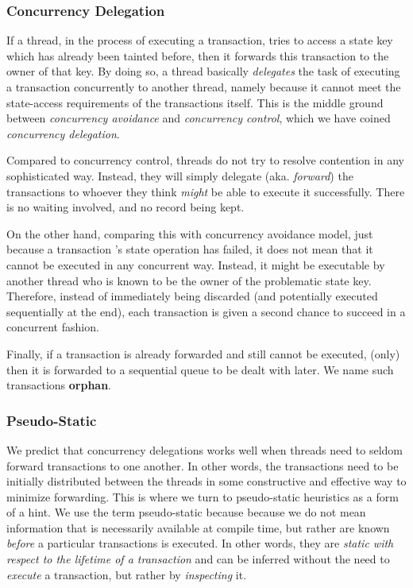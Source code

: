\subsubsection{Concurrency Delegation}

If a thread, in the process of executing a transaction, tries to access a state key which has
already been tainted before, then it forwards this transaction to the owner of that key. By doing
so, a thread basically \textit{delegates} the task of executing a transaction concurrently to
another thread, namely because it cannot meet the state-access requirements of the transactions
itself. This is the middle ground between \textit{concurrency avoidance} and \textit{concurrency
control}, which we have coined \textit{concurrency delegation}.

Compared to concurrency control, threads do not try to resolve contention in any sophisticated way.
Instead, they will simply delegate (aka. \textit{forward}) the transactions to whoever they think
\textit{might} be able to execute it successfully. There is no waiting involved, and no record being
kept.

On the other hand, comparing this with concurrency avoidance model, just because a transaction 's
state operation has failed, it does not mean that it cannot be executed in any concurrent way.
Instead, it might be executable by another thread who is known to be the owner of the problematic
state key. Therefore, instead of immediately being discarded (and potentially executed sequentially
at the end), each transaction is given a second chance to succeed in a concurrent fashion.

Finally, if a transaction is already forwarded and still cannot be executed, (only) then it is
forwarded to a sequential queue to be dealt with later. We name such transactions \textbf{orphan}.

\subsubsection{Pseudo-Static}

We predict that concurrency delegations works well when threads need to seldom forward transactions
to one another. In other words, the transactions need to be initially distributed between the
threads in some constructive and effective way to minimize forwarding. This is where we turn to
pseudo-static heuristics as a form of a hint. We use the term pseudo-static because because we
do not mean information that is necessarily available at compile time, but rather are known
\textit{before} a particular transactions is executed. In other words, they are \textit{static with
respect to the lifetime of a transaction} and can be inferred without the need to \textit{execute}
a transaction, but rather by \textit{inspecting} it.

